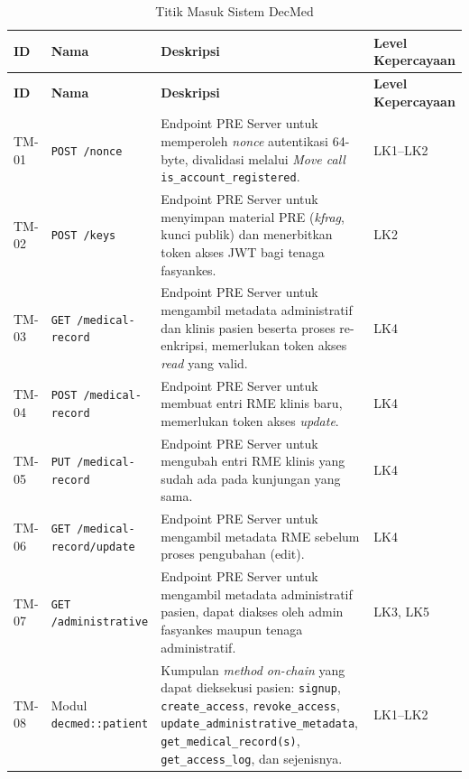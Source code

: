 \begin{xltabular}{\textwidth}{|>{\centering\arraybackslash}p{1.4cm}|>{\raggedright\arraybackslash}p{4.2cm}|X|>{\centering\arraybackslash}p{2cm}|}
    \caption{Titik Masuk Sistem DecMed}
    \label{tab:titik-masuk} \\
    \hline
    \textbf{ID} & \textbf{Nama} & \textbf{Deskripsi} & \textbf{Level Kepercayaan} \\
    \hline
    \endfirsthead
    \hline
    \textbf{ID} & \textbf{Nama} & \textbf{Deskripsi} & \textbf{Level Kepercayaan} \\
    \hline
    \endhead
    \hline
    \endfoot
    \hline
    \endlastfoot

    TM-01 & \texttt{POST /nonce} & Endpoint PRE Server untuk memperoleh \textit{nonce} autentikasi 64-byte, divalidasi melalui \textit{Move call} \texttt{is\_account\_registered}. & LK1--LK2 \\
    \hline

    TM-02 & \texttt{POST /keys} & Endpoint PRE Server untuk menyimpan material PRE (\textit{kfrag}, kunci publik) dan menerbitkan token akses JWT bagi tenaga fasyankes. & LK2 \\
    \hline

    TM-03 & \texttt{GET /medical-record} & Endpoint PRE Server untuk mengambil metadata administratif dan klinis pasien beserta proses re-enkripsi, memerlukan token akses \textit{read} yang valid. & LK4 \\
    \hline

    TM-04 & \texttt{POST /medical-record} & Endpoint PRE Server untuk membuat entri RME klinis baru, memerlukan token akses \textit{update}. & LK4 \\
    \hline

    TM-05 & \texttt{PUT /medical-record} & Endpoint PRE Server untuk mengubah entri RME klinis yang sudah ada pada kunjungan yang sama. & LK4 \\
    \hline

    TM-06 & \texttt{GET /medical-record/update} & Endpoint PRE Server untuk mengambil metadata RME sebelum proses pengubahan (edit). & LK4 \\
    \hline

    TM-07 & \texttt{GET /administrative} & Endpoint PRE Server untuk mengambil metadata administratif pasien, dapat diakses oleh admin fasyankes maupun tenaga administratif. & LK3, LK5 \\
    \hline

    TM-08 & Modul \texttt{decmed::patient} & Kumpulan \textit{method on-chain} yang dapat dieksekusi pasien: \texttt{signup}, \texttt{create\_access}, \texttt{revoke\_access}, \texttt{update\_administrative\_metadata}, \texttt{get\_medical\_record(s)}, \texttt{get\_access\_log}, dan sejenisnya. & LK1--LK2 \\
    \hline


\end{xltabular}
